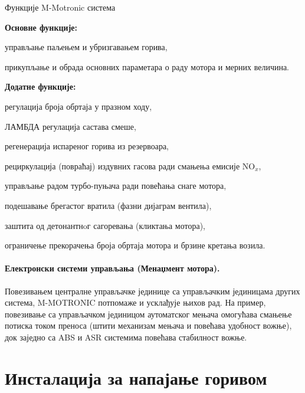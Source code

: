 \documentclass{report}
\begin{document}
\begin{podela}{Функције M-Motronic система}
\begin{lista}
    \item \textbf{Основне функције:}
    \begin{lista}
        \item управљање паљењем и убризгавањем горива,
        \item прикупљање и обрада основних параметара о раду мотора и мерних величина.
    \end{lista}
    \item \textbf{Додатне функције:}
    \begin{lista}
        \item регулација броја обртаја у празном ходу,
        \item ЛАМБДА регулација састава смеше,
        \item регенерација испареног горива из резервоара,
        \item рециркулација (повраћај) издувних гасова ради смањења емисије $\text{NO}_x$,
        \item управљање радом турбо-пуњача ради повећања снаге мотора,
        \item подешавање брегастог вратила (фазни дијаграм вентила),
        \item заштита од детонантнoг сагоревања (кликтања мотора),
        \item ограничење прекорачења броја обртаја мотора и брзине кретања возила.
    \end{lista}
\end{lista}
\end{podela}

\paragraph*{Електронски системи управљања (Менаџмент мотора).}
Повезивањем централне управљачке јединице са управљачким јединицама других
система, M-MOTRONIC потпомаже и усклађује њихов рад. На пример, повезивање са
управљачком јединицом аутоматског мењача омогућава смањење потиска током
преноса (штити механизам мењача и повећава удобност вожње), док заједно са
ABS и ASR системима повећава стабилност вожње.

\section{Инсталација за напајање горивом}
\end{document}
